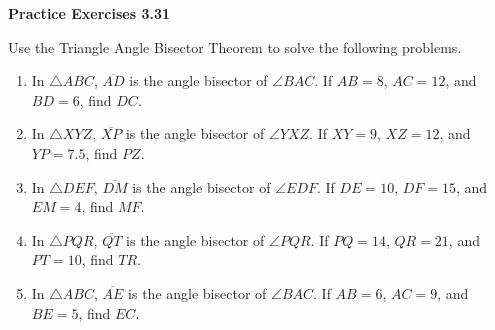 \vspace{0.3ex}
\noindent\textbf{Practice Exercises 3.31}

\vspace{0.2ex}

Use the Triangle Angle Bisector Theorem to solve the following problems.

\begin{enumerate}[label=\color{blue}\arabic*.]
    \item In \(\triangle ABC\), \(\overline{AD}\) is the angle bisector of \(\angle BAC\). If \(AB = 8\), \(AC = 12\), and \(BD = 6\), find \(DC\).
    \item In \(\triangle XYZ\), \(\overline{XP}\) is the angle bisector of \(\angle YXZ\). If \(XY = 9\), \(XZ = 12\), and \(YP = 7.5\), find \(PZ\).
    \item In \(\triangle DEF\), \(\overline{DM}\) is the angle bisector of \(\angle EDF\). If \(DE = 10\), \(DF = 15\), and \(EM = 4\), find \(MF\).
    \item In \(\triangle PQR\), \(\overline{QT}\) is the angle bisector of \(\angle PQR\). If \(PQ = 14\), \(QR = 21\), and \(PT = 10\), find \(TR\).
    \item In \(\triangle ABC\), \(\overline{AE}\) is the angle bisector of \(\angle BAC\). If \(AB = 6\), \(AC = 9\), and \(BE = 5\), find \(EC\).
\end{enumerate}
